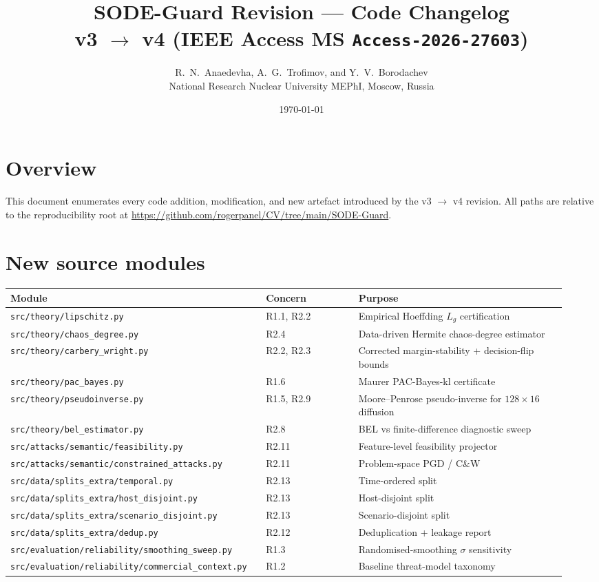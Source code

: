 \documentclass[11pt,letterpaper]{article}
\title{\vspace{-1.2cm}\textbf{SODE-Guard Revision — Code Changelog}\\[4pt]
       \normalsize v3 $\rightarrow$ v4 (IEEE Access MS \texttt{Access-2026-27603})}
\author{R.\ N.\ Anaedevha, A.\ G.\ Trofimov, and Y.\ V.\ Borodachev\\
        \normalsize National Research Nuclear University MEPhI, Moscow, Russia}
\date{\normalsize \today}
\begin{document}
\maketitle
\thispagestyle{fancy}
\vspace{-0.6cm}

\section*{Overview}
This document enumerates every code addition, modification, and new
artefact introduced by the v3 $\rightarrow$ v4 revision. All paths are
relative to the reproducibility root at
\url{https://github.com/rogerpanel/CV/tree/main/SODE-Guard}.

\section{New source modules}
\begin{longtable}{@{}p{0.42\linewidth}p{0.16\linewidth}p{0.36\linewidth}@{}}
\toprule
\textbf{Module} & \textbf{Concern} & \textbf{Purpose} \\
\midrule
\endhead
\texttt{src/theory/lipschitz.py} & R1.1, R2.2 & Empirical Hoeffding $L_g$ certification \\
\texttt{src/theory/chaos\_degree.py} & R2.4 & Data-driven Hermite chaos-degree estimator \\
\texttt{src/theory/carbery\_wright.py} & R2.2, R2.3 & Corrected margin-stability + decision-flip bounds \\
\texttt{src/theory/pac\_bayes.py} & R1.6 & Maurer PAC-Bayes-kl certificate \\
\texttt{src/theory/pseudoinverse.py} & R1.5, R2.9 & Moore--Penrose pseudo-inverse for $128\times 16$ diffusion \\
\texttt{src/theory/bel\_estimator.py} & R2.8 & BEL vs finite-difference diagnostic sweep \\
\texttt{src/attacks/semantic/feasibility.py} & R2.11 & Feature-level feasibility projector \\
\texttt{src/attacks/semantic/constrained\_attacks.py} & R2.11 & Problem-space PGD / C\&W \\
\texttt{src/data/splits\_extra/temporal.py} & R2.13 & Time-ordered split \\
\texttt{src/data/splits\_extra/host\_disjoint.py} & R2.13 & Host-disjoint split \\
\texttt{src/data/splits\_extra/scenario\_disjoint.py} & R2.13 & Scenario-disjoint split \\
\texttt{src/data/splits\_extra/dedup.py} & R2.12 & Deduplication + leakage report \\
\texttt{src/evaluation/reliability/smoothing\_sweep.py} & R1.3 & Randomised-smoothing $\sigma$ sensitivity \\
\texttt{src/evaluation/reliability/commercial\_context.py} & R1.2 & Baseline threat-model taxonomy \\
\bottomrule
\end{longtable}
\end{document}
